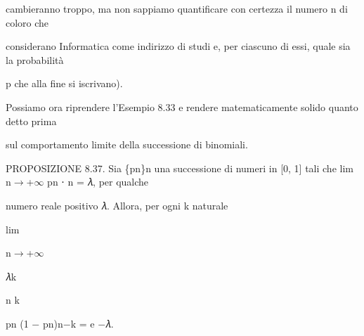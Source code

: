 \documentclass[a4paper,portrait,12pt]{article}
\begin{document}
\begin{flushleft}
cambieranno troppo, ma non sappiamo quantificare con certezza il numero n di coloro che
\end{flushleft}


\begin{flushleft}
considerano Informatica come indirizzo di studi e, per ciascuno di essi, quale sia la probabilit\`{a}
\end{flushleft}


\begin{flushleft}
p che alla fine si iscrivano).
\end{flushleft}


\begin{flushleft}
Possiamo ora riprendere l'Esempio 8.33 e rendere matematicamente solido quanto detto prima
\end{flushleft}


\begin{flushleft}
sul comportamento limite della successione di binomiali.
\end{flushleft}





\begin{flushleft}
PROPOSIZIONE 8.37. Sia \{pn\}n una successione di numeri in [0, 1] tali che lim n$\rightarrow$+$\infty$ pn ⋅ n = 𝜆, per qualche
\end{flushleft}


\begin{flushleft}
numero reale positivo 𝜆. Allora, per ogni k naturale
\end{flushleft}


\begin{flushleft}
lim
\end{flushleft}





\begin{flushleft}
n$\rightarrow$+$\infty$
\end{flushleft}





\begin{flushleft}
𝜆k
\end{flushleft}


\begin{flushleft}
n k
\end{flushleft}


\begin{flushleft}
pn (1 $-$ pn)n$-$k = e $-$𝜆.
\end{flushleft}
\end{document}
